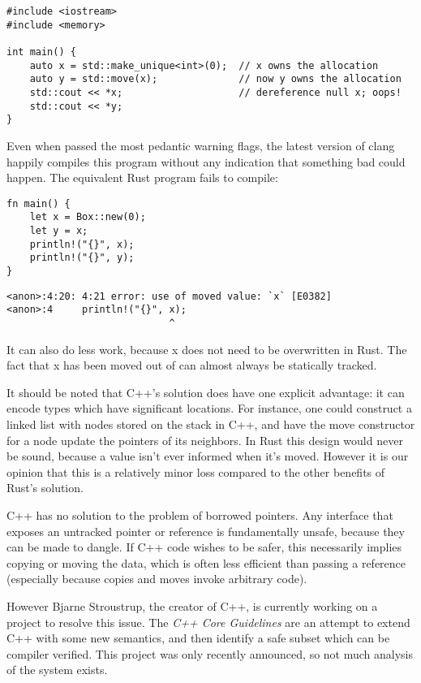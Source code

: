 \begin{verbatim}
#include <iostream>
#include <memory>

int main() {
    auto x = std::make_unique<int>(0);  // x owns the allocation
    auto y = std::move(x);              // now y owns the allocation
    std::cout << *x;                    // dereference null x; oops!
    std::cout << *y;
}
\end{verbatim}

Even when passed the most pedantic warning flags, the latest version of clang
happily compiles this program without any indication that something bad could
happen. The equivalent Rust program fails to compile:

\begin{verbatim}
fn main() {
    let x = Box::new(0);
    let y = x;
    println!("{}", x);
    println!("{}", y);
}
\end{verbatim}

\begin{verbatim}
<anon>:4:20: 4:21 error: use of moved value: `x` [E0382]
<anon>:4     println!("{}", x);
                            ^
\end{verbatim}

It can also do less work, because x does not need to be overwritten in
Rust. The fact that x has been moved out of can almost always be statically
tracked.

It should be noted that C++'s solution does have one explicit advantage: it
can encode types which have significant locations. For instance, one could
construct a linked list with nodes stored on the stack in C++, and have the
move constructor for a node update the pointers of its neighbors. In Rust
this design would never be sound, because a value isn't ever informed when it's
moved. However it is our opinion that this is a relatively minor loss compared
to the other benefits of Rust's solution.

C++ has no solution to the problem of borrowed pointers. Any interface that
exposes an untracked pointer or reference is fundamentally unsafe, because they
can be made to dangle. If C++ code wishes to be safer, this necessarily implies
copying or moving the data, which is often less efficient than passing a reference
(especially because copies and moves invoke arbitrary code).

However Bjarne Stroustrup, the creator of C++, is currently working on a project
to resolve this issue. The \emph{C++ Core Guidelines} are an attempt to extend
C++ with some new semantics, and then identify a safe subset which can be compiler
verified. This project was only recently announced, so not much analysis of the
system exists.

